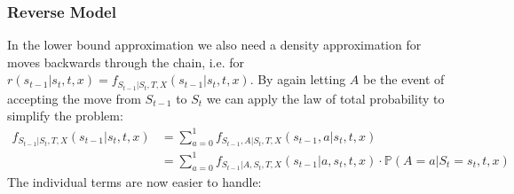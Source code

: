 \subsubsection{Reverse Model}
\label{sec:TransDensitiesWithAcceptReverse}
In the lower bound approximation we also need a density approximation for moves backwards through the chain, i.e. for $r(s_{t-1}|s_t, t, x) = f_{S_{t-1}|S_t,T, X}(s_{t-1} | s_t, t, x)$. By again letting $A$ be the event of accepting the move from $S_{t-1}$ to $S_t$ we can apply the law of total probability to simplify the problem:
\begin{equation}
\begin{split}
f_{S_{t-1}|S_t, T, X}(s_{t-1} | s_t, t, x) &= \sum_{a=0}^1 f_{S_{t-1}, A|S_t, T, X}(s_{t-1}, a | s_t, t, x) \\
&= \sum_{a=0}^1 f_{S_{t-1} |A, S_t, T, X}(s_{t-1} | a, s_t, t, x) \cdot \mathbb{P}(A = a | S_{t} = s_{t}, t, x)
\end{split}
\end{equation}
The individual terms are now easier to handle:

